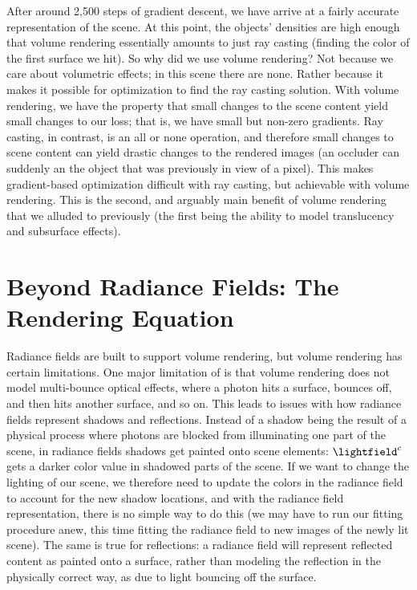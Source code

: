 After around 2,500 steps of gradient descent, we have arrive at a fairly accurate representation of the scene. At this point, the objects' densities are high enough that
volume rendering essentially amounts to just ray casting (finding the color of the first surface we hit). So why did we use volume rendering?
Not because we care about volumetric effects; in this scene there are none. Rather because it makes it possible for optimization to find the ray casting solution. With volume rendering, we have the property that small changes to the scene content yield small changes to our loss; that is, we have small but non-zero gradients. Ray casting, in contrast, is an all or none operation, and therefore small changes to scene content can yield drastic changes to the rendered images (an occluder can suddenly an the object that was previously in view of a pixel). This makes gradient-based optimization difficult with ray casting, but achievable with volume rendering. This is the second, and arguably main benefit of volume rendering that we alluded to previously (the first being the ability to model translucency and subsurface effects).


\section{Beyond Radiance Fields: The Rendering Equation}

Radiance fields are built to support volume rendering, but volume rendering has certain limitations. One major limitation of is that volume rendering does not model multi-bounce optical effects, where a photon hits a surface, bounces off, and then hits another surface, and so on. This leads to issues with how radiance fields represent shadows and reflections. Instead of a shadow being the result of a physical process where photons are blocked from illuminating one part of the scene, in radiance fields shadows get painted onto scene elements: $\lightfield^c$ gets a darker color value in shadowed parts of the scene. If we want to change the lighting of our scene, we therefore need to update the colors in the radiance field to account for the new shadow locations, and with the radiance field representation, there is no simple way to do this (we may have to run our fitting procedure anew, this time fitting the radiance field to new images of the newly lit scene). The same is true for reflections: a radiance field will represent reflected content as painted onto a surface, rather than modeling the reflection in the physically correct way, as due to light bouncing off the surface.

